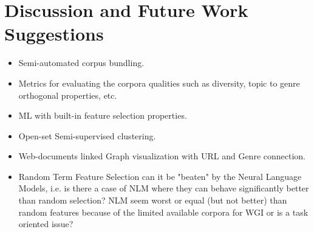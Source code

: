 \section{Discussion and Future Work Suggestions}\label{chap:relevant_work:sec:intro}

\begin{itemize}
\item Semi-automated corpus bundling.
\item Metrics for evaluating the corpora qualities such as diversity, topic to genre orthogonal properties, etc.
\item ML with built-in feature selection properties.
\item Open-set Semi-supervised clustering.
\item Web-documents linked Graph visualization with URL and Genre connection.
\item Random Term Feature Selection can it be "beaten" by the Neural Language Models, i.e. is there a case of NLM where they can behave significantly better than random selection? NLM seem worst or equal (but not better) than random features because of the limited available corpora for WGI or is a task oriented issue?
\end{itemize}


























